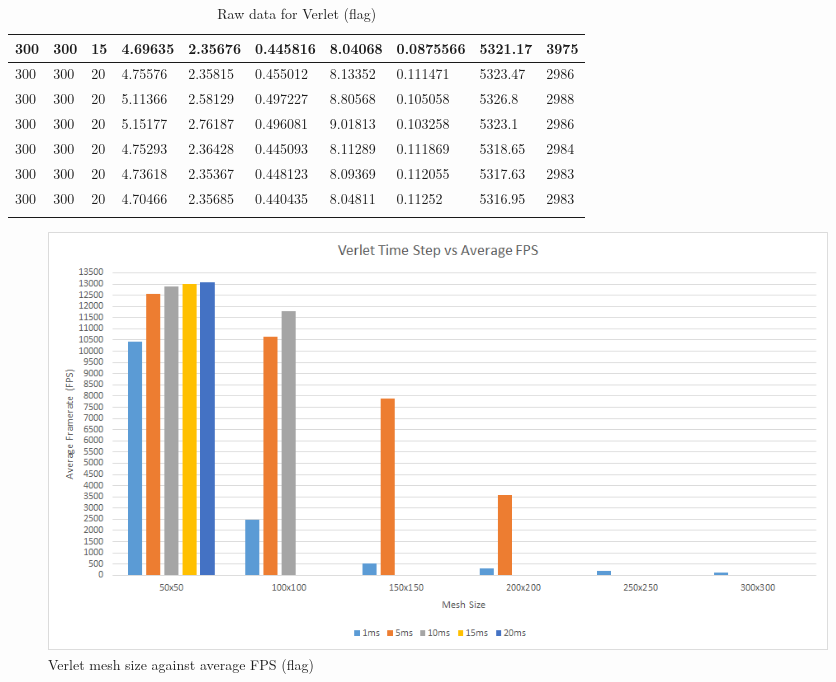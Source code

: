 \begin{landscape}
\begin{longtable}{ | l | l | l | l | l | l | l | l | l | l | }
300 & 300 & 15 & 4.69635 & 2.35676 & 0.445816 & 8.04068 & 0.0875566 & 5321.17 & 3975\\ \hline
300 & 300 & 20 & 4.75576 & 2.35815 & 0.455012 & 8.13352 & 0.111471 & 5323.47 & 2986\\ \hline
300 & 300 & 20 & 5.11366 & 2.58129 & 0.497227 & 8.80568 & 0.105058 & 5326.8 & 2988\\ \hline
300 & 300 & 20 & 5.15177 & 2.76187 & 0.496081 & 9.01813 & 0.103258 & 5323.1 & 2986\\ \hline
300 & 300 & 20 & 4.75293 & 2.36428 & 0.445093 & 8.11289 & 0.111869 & 5318.65 & 2984\\ \hline
300 & 300 & 20 & 4.73618 & 2.35367 & 0.448123 & 8.09369 & 0.112055 & 5317.63 & 2983\\ \hline
300 & 300 & 20 & 4.70466 & 2.35685 & 0.440435 & 8.04811 & 0.11252 & 5316.95 & 2983\\ \hline
  \caption{Raw data for Verlet (flag)}
    \label{tab:v raw flag}
\end{longtable}


    \begin{figure}[!htb]
    \begin{center}
      \includegraphics[scale=0.95]{Figures/flag_v_fps}
    \end{center}
    \caption{Verlet mesh size against average FPS (flag)}
    \label{fig:v fps flag}
  \end{figure}
\end{landscape}
  
